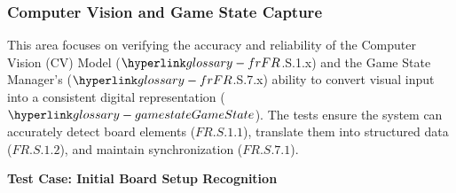 \documentclass[12pt, titlepage]{article}
\begin{document}
\subsubsection{Computer Vision and Game State Capture}

This area focuses on verifying the accuracy and reliability of the Computer Vision (CV) Model ($\FR{}$.S.1.x) and the Game State Manager's ($\FR{}$.S.7.x) ability to convert visual input into a consistent digital representation ($\GameState{}$).
The tests ensure the system can accurately detect board elements ($\hyperref[FR.S.1.1]{FR.S.1.1}$), translate them into structured data ($\hyperref[FR.S.1.2]{FR.S.1.2}$), and maintain synchronization ($\hyperref[FR.S.7.1]{FR.S.7.1}$).

\textbf{Test Case: Initial Board Setup Recognition}
\end{document}
